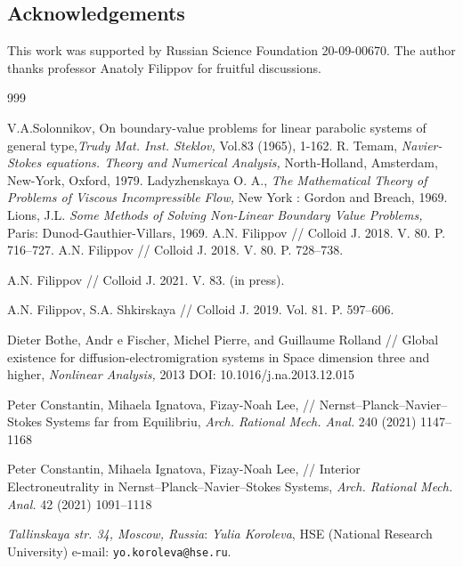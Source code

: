 \documentclass{amsart}
\begin{document}
\subsection*{Acknowledgements} This work was supported by Russian Science Foundation 20-09-00670. The author thanks professor Anatoly Filippov for fruitful discussions.

{\small
\begin{thebibliography}{999}

V.A.Solonnikov, On boundary-value problems for linear parabolic systems of general type,{\it Trudy Mat. Inst. Steklov,} Vol.83 (1965), 1-162.
R. Temam, {\it Navier-Stokes equations. Theory and Numerical Analysis,} North-Holland, Amsterdam, New-York, Oxford, 1979.
Ladyzhenskaya O. A., {\it The  Mathematical Theory of Problems of Viscous Incompressible Flow,} New York : Gordon and Breach, 1969.
Lions, J.L. { \it Some Methods of Solving Non-Linear Boundary Value Problems,} Paris: Dunod-Gauthier-Villars, 1969.  
A.N. Filippov // Colloid J. 2018. V. 80. P. 716–727.
 A.N. Filippov // Colloid J. 2018. V. 80. P. 728–738.

A.N. Filippov // Colloid J. 2021. V. 83. (in press).

 A.N. Filippov, S.A. Shkirskaya // Colloid J. 2019. Vol. 81. P. 597–606.

 Dieter Bothe, Andr e Fischer, Michel Pierre, and Guillaume Rolland // Global existence for diffusion-electromigration systems in
Space dimension three and higher, {\it Nonlinear Analysis,} 2013
DOI: 10.1016/j.na.2013.12.015

 Peter Constantin, Mihaela Ignatova,  Fizay-Noah Lee, // Nernst–Planck–Navier–Stokes Systems far
from Equilibriu, {\it Arch. Rational Mech. Anal.} 240 (2021) 1147–1168

 Peter Constantin, Mihaela Ignatova,  Fizay-Noah Lee, // Interior Electroneutrality in
Nernst–Planck–Navier–Stokes Systems, {\it Arch. Rational Mech. Anal.} 42 (2021) 1091–1118



\end{thebibliography}}

{\small
{\em Tallinskaya str. 34,
Moscow, Russia}:
{\em Yulia Koroleva}, HSE (National Research University)
 e-mail: \texttt{yo.koroleva@hse.ru}.

}
\end{document}
